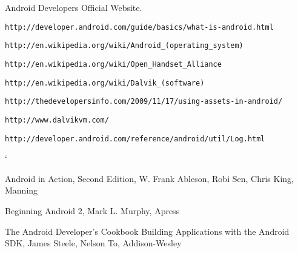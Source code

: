 \documentclass[journal]{IEEEtran}
\begin{document}
\renewcommand{\refname}{Referencias}
\begin{thebibliography}{50}
 Android Developers Official Website.\\
\begin{scriptsize}  \verb|http://developer.android.com/guide/basics/what-is-android.html|\end{scriptsize}
\begin{scriptsize}  \verb|http://en.wikipedia.org/wiki/Android_(operating_system)|\end{scriptsize}
\begin{scriptsize}  \verb|http://en.wikipedia.org/wiki/Open_Handset_Alliance|\end{scriptsize}
\begin{scriptsize}  \verb|http://en.wikipedia.org/wiki/Dalvik_(software)|\end{scriptsize}
\begin{scriptsize}  \verb|http://thedevelopersinfo.com/2009/11/17/using-assets-in-android/|\end{scriptsize}
\begin{scriptsize}  \verb|http://www.dalvikvm.com/|\end{scriptsize}
\begin{scriptsize}  \verb|http://developer.android.com/reference/android/util/Log.html| \end{scriptsize}`
\begin{scriptsize}Android in Action, Second Edition, W. Frank Ableson, Robi Sen, Chris King, Manning \end{scriptsize}
\begin{scriptsize}Beginning Android 2, Mark L. Murphy, Apress \end{scriptsize}
\begin{scriptsize}The Android Developer's Cookbook Building Applications with the Android SDK, James Steele, Nelson To, 
Addison-Wesley \end{scriptsize}

\end{thebibliography}
\end{document}
